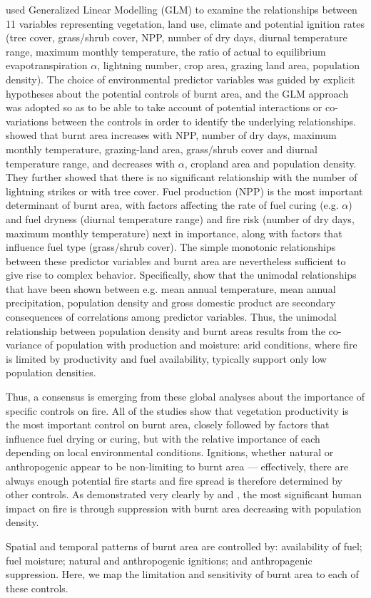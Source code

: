 \citet{bistinas2014causal} used Generalized Linear Modelling (GLM) to examine the relationships between 11 variables representing vegetation, land use, climate and potential ignition rates (tree cover, grass/shrub cover, NPP, number of dry days, diurnal temperature range, maximum monthly temperature, the ratio of actual to equilibrium evapotranspiration $\alpha$, lightning number, crop area, grazing land area, population density).  
The choice of environmental predictor variables was guided by explicit hypotheses about the potential controls of burnt area, and the GLM approach was adopted so as to be able to take account of potential interactions or co-variations between the controls in order to identify the underlying relationships.
\citet{bistinas2014causal} showed that burnt area increases with NPP, number of dry days, maximum monthly temperature, grazing-land area, grass/shrub cover and diurnal temperature range, and decreases with $\alpha$, cropland area and population density.
They further showed that there is no significant relationship with the number of lightning strikes or with tree cover.
Fuel production (NPP) is the most important determinant of burnt area, with factors affecting the rate of fuel curing (e.g. $\alpha$) and fuel dryness (diurnal temperature range) and fire risk (number of dry days, maximum monthly temperature) next in importance, along with factors that influence fuel type (grass/shrub cover).
The simple monotonic relationships between these predictor variables and burnt area are nevertheless sufficient to give rise to complex behavior.
Specifically, \citet{bistinas2014causal} show that the unimodal relationships that have been shown between e.g. mean annual temperature, mean annual precipitation, population density and gross domestic product are secondary consequences of correlations among predictor variables. Thus, the unimodal relationship between population density and burnt areas results from the co-variance of population with production and moisture: arid conditions, where fire is limited by productivity and fuel availability, typically support only low population densities.

Thus, a consensus is emerging from these global analyses about the importance of specific controls on fire. All of the studies show that vegetation productivity is the most important control on burnt area, closely followed by factors that influence fuel drying or curing, but with the relative importance of each depending on local environmental conditions. Ignitions, whether natural or anthropogenic appear to be non-limiting to burnt area --- effectively, there are always enough potential fire starts and fire spread is therefore determined by other controls. As demonstrated very clearly by \citet{Knorr2013} and \citet{Bistinas}, the most significant human impact on fire is through suppression with burnt area decreasing with population density.


Spatial and temporal patterns of burnt area are controlled by:
    availability of fuel;
    fuel moisture;
    natural and anthropogenic ignitions;
    and anthropagenic suppression.
Here, we map the limitation and sensitivity of burnt area to each of these controls.
